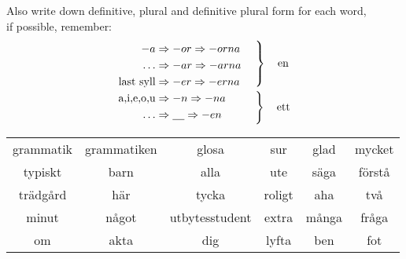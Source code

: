 \begin{flushleft}
    Also write down definitive, plural and definitive plural form
    for each word,\\
    if possible, remember:
    \begin{equation*}
        \begin{aligned}
            -a &\Rightarrow -or \Rightarrow -orna & \\
            \ldots &\Rightarrow -ar \Rightarrow -arna & \\
            \text{last syll} &\Rightarrow -er \Rightarrow -erna & \\
            \text{a,i,e,o,u} &\Rightarrow -n \Rightarrow -na & \\
            \ldots &\Rightarrow \underline{\phantom{no}} \Rightarrow -en & \\
        \end{aligned}
        \begin{aligned}
            &\left.\vphantom{\begin{aligned}
                -a &\Rightarrow -or \Rightarrow -orna & \\
                \ldots &\Rightarrow -ar \Rightarrow -arna & \\
                \text{last syll} &\Rightarrow -er \Rightarrow -erna & \\
            \end{aligned}}\right\rbrace\quad\text{en}\\
            &\left.\vphantom{\begin{aligned}
                \text{a,i,e,o,u} &\Rightarrow -n \Rightarrow -na & \\
                \ldots &\Rightarrow \underline{\phantom{no}} \Rightarrow -en & \\
            \end{aligned}}\right\rbrace\quad\text{ett}
        \end{aligned}
    \end{equation*}
\end{flushleft}
\begin{center}
    \begin{tabular}{|c c c c c c|}
        \hline
        grammatik & grammatiken & glosa & sur & glad & mycket \\
        typiskt & barn & alla & ute & säga & förstå \\
        trädgård & här & tycka & roligt & aha & två \\
        minut & något & utbytesstudent & extra & många & fråga \\
        om & akta & dig & lyfta & ben & fot \\
        \hline
    \end{tabular}
\end{center}

